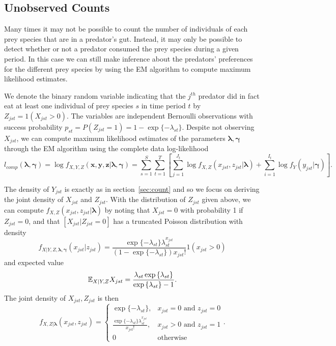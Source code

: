 \subsection{Unobserved Counts}
\label{sec:noncount}

Many times it may not be possible to count the number of individuals of each prey species that are in a predator's gut.  Instead, it may only be possible to detect whether or not a predator consumed the prey species during a given period.  In this case we can still make inference about the predators' preferences for the different prey species by using the EM algorithm to compute maximum likelihood estimates. 

We denote the binary random variable indicating that the $j^{th}$ predator did in fact eat at least one individual of prey species $s$ in time period $t$ by $Z_{jst} = 1(X_{jst} > 0)$.  The variables are independent Bernoulli observations with success probability $p_{st} = P(Z_{jst}=1)= 1-\exp\{-\lambda_{st}\}$.  Despite not observing $X_{jst}$, we can compute maximum likelihood estimates of the parameters $\boldsymbol{\lambda}, \boldsymbol{\gamma}$ through the EM algorithm using the complete data log-likelihood
\[
l_{comp}(\boldsymbol{\lambda}, \boldsymbol{\gamma}) = \log f_{X,Y,Z}(\boldsymbol x, \boldsymbol y, \boldsymbol z|\boldsymbol{\lambda}, \boldsymbol{\gamma}) = \sum_{s=1}^{S} \sum_{t=1}^T \left[ \sum_{j=1}^{J_t} \log f_{X,Z}(x_{jst},z_{jst}|\boldsymbol{\lambda}) + \sum_{i=1}^{I_t}\log f_Y(y_{jst}|\boldsymbol{\gamma}) \right].
\]

The density of $Y_{jst}$ is exactly as in section~\ref{sec:count} and so we focus on deriving the joint density of $X_{jst}$ and $Z_{jst}$.  With the distribution of $Z_{jst}$ given above, we can compute $f_{X,Z}(x_{jst},z_{jst}|\boldsymbol{\lambda})$ by noting that $X_{jst}=0$ with probability 1 if $Z_{jst}=0$, and that $[X_{jst}|Z_{jst}=0]$ has a truncated Poisson distribution with density
\[
  f_{X|Y,Z,\boldsymbol{\lambda},\boldsymbol{\gamma}}(x_{jst}|z_{jst}) =
  \frac{\exp{\{-\lambda_{st}\}} \lambda_{st}^{x_{jst}}}{(1 - \exp{\{-\lambda_{st}\}}) x_{jst}!}1(x_{jst} > 0)
\]
and expected value
\[
\mathbb{E}_{X|Y,Z}X_{jst} = \frac{\lambda_{st} \exp{\{\lambda_{st} \}}}{\exp{\{ \lambda_{st} \}} - 1}.
\]
\noindent The joint density of $X_{jst}, Z_{jst}$ is then 
\begin{equation*}
    f_{X,Z|\boldsymbol{\lambda}}(x_{jst},z_{jst}) = \left\{
    \begin{array}{lr}
      \exp{\{ -\lambda_{st} \}}, & x_{jst}=0 \mbox{ and } z_{jst} = 0 \\
      \frac{\exp{\{-\lambda_{st} \}} \lambda_{st}^{x_{jst}}}{x_{jst}!}, & x_{jst} > 0 \mbox{ and } z_{jst} = 1 \\
      0 & \mbox{otherwise}
    \end{array}
  \right..
\end{equation*}

